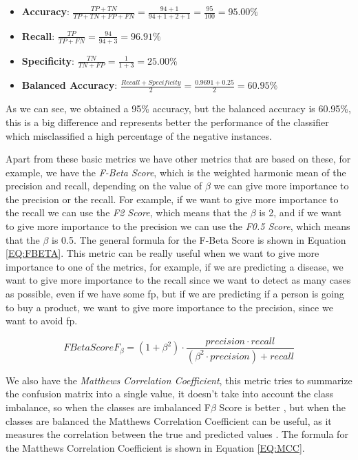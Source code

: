 \begin{itemize}
    \item \textbf{Accuracy}: $ \frac{TP + TN}{TP + TN + FP + FN} = \frac{94 + 1}{94+1+2+1} = \frac{95}{100} = 95.00\%$
    \item \textbf{Recall}: $\frac{TP}{TP + FN}=\frac{94}{94+3} = 96.91\%$
    \item \textbf{Specificity}: $\frac{TN}{TN + FP}=\frac{1}{1+3} = 25.00\%$
    \item \textbf{Balanced Accuracy}: $\frac{Recall + Specificity}{2}=\frac{0.9691 + 0.25}{2} = 60.95\%$
\end{itemize}

As we can see, we obtained a 95\% accuracy, but the balanced accuracy is 60.95\%, this is a big difference and represents better the performance of the classifier which misclassified a high percentage of the negative instances.

Apart from these basic metrics we have other metrics that are based on these, for example, we have the \textit{F-Beta Score}, which is the weighted harmonic mean of the precision and recall, depending on the value of $\beta$ we can give more importance to the precision or the recall. For example, if we want to give more importance to the recall we can use the \textit{F2 Score}, which means that the $\beta$ is 2, and if we want to give more importance to the precision we can use the \textit{F0.5 Score}, which means that the $\beta$ is 0.5. The general formula for the F-Beta Score is shown in Equation \ref{EQ:FBETA}. This metric can be really useful when we want to give more importance to one of the metrics, for example, if we are predicting a disease, we want to give more importance to the recall since we want to detect as many cases as possible, even if we have some \ac{fp}, but if we are predicting if a person is going to buy a product, we want to give more importance to the precision, since we want to avoid \ac{fp}.

\begin{equation}[EQ:FBETA]{F Beta Score}
    \boxed{F_{\beta} = (1+\beta^2)\cdot\frac{precision \cdot recall}{(\beta^2\cdot precision)+recall}}
\end{equation}

We also have the \textit{Matthews Correlation Coefficient}, this metric tries to summarize the confusion matrix into a single value, it 
doesn't 
take into account the class imbalance, so when the classes are imbalanced F$\beta$ Score is better \cite{sisters_matthews_2020}, but when the classes are balanced the Matthews Correlation Coefficient can be useful, as it measures the correlation between the true and predicted values \cite{shmueli_matthews_2020}. The formula for the Matthews Correlation Coefficient is shown in Equation \ref{EQ:MCC}.

